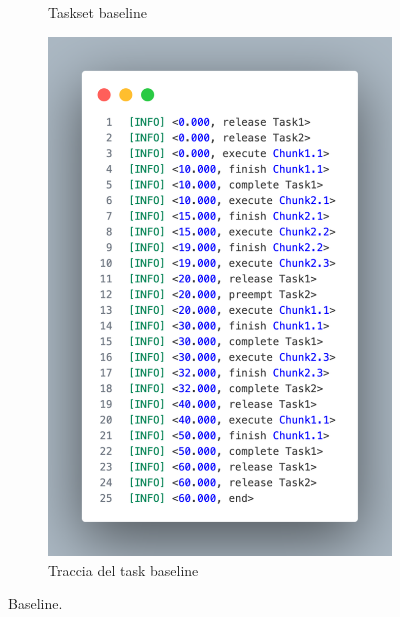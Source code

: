 \begin{figure}[htbp]
    \centering
    \begin{subfigure}{0.45\textwidth}
        \vfill
        \centering
        \caption{Taskset baseline}
        \label{fig:baselineTaskset}
        \vfill
    \end{subfigure}
    \hfill
    \begin{subfigure}{0.45\textwidth}
        \vfill
        \centering
        \includegraphics[width=.9\textwidth]{immagini/trace baseline.pdf}
        \caption{Traccia del task baseline}
        \label{fig:baselineTrace}
        \vfill
    \end{subfigure}
    \caption{Baseline.}
\end{figure}

